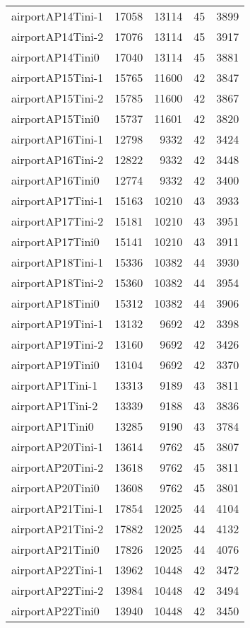 \begin{longtable}{lrrrr}
airportAP14Tini-1 & 17058 & 13114 & 45 & 3899 \\
airportAP14Tini-2 & 17076 & 13114 & 45 & 3917 \\
airportAP14Tini0 & 17040 & 13114 & 45 & 3881 \\
airportAP15Tini-1 & 15765 & 11600 & 42 & 3847 \\
airportAP15Tini-2 & 15785 & 11600 & 42 & 3867 \\
airportAP15Tini0 & 15737 & 11601 & 42 & 3820 \\
airportAP16Tini-1 & 12798 & 9332 & 42 & 3424 \\
airportAP16Tini-2 & 12822 & 9332 & 42 & 3448 \\
airportAP16Tini0 & 12774 & 9332 & 42 & 3400 \\
airportAP17Tini-1 & 15163 & 10210 & 43 & 3933 \\
airportAP17Tini-2 & 15181 & 10210 & 43 & 3951 \\
airportAP17Tini0 & 15141 & 10210 & 43 & 3911 \\
airportAP18Tini-1 & 15336 & 10382 & 44 & 3930 \\
airportAP18Tini-2 & 15360 & 10382 & 44 & 3954 \\
airportAP18Tini0 & 15312 & 10382 & 44 & 3906 \\
airportAP19Tini-1 & 13132 & 9692 & 42 & 3398 \\
airportAP19Tini-2 & 13160 & 9692 & 42 & 3426 \\
airportAP19Tini0 & 13104 & 9692 & 42 & 3370 \\
airportAP1Tini-1 & 13313 & 9189 & 43 & 3811 \\
airportAP1Tini-2 & 13339 & 9188 & 43 & 3836 \\
airportAP1Tini0 & 13285 & 9190 & 43 & 3784 \\
airportAP20Tini-1 & 13614 & 9762 & 45 & 3807 \\
airportAP20Tini-2 & 13618 & 9762 & 45 & 3811 \\
airportAP20Tini0 & 13608 & 9762 & 45 & 3801 \\
airportAP21Tini-1 & 17854 & 12025 & 44 & 4104 \\
airportAP21Tini-2 & 17882 & 12025 & 44 & 4132 \\
airportAP21Tini0 & 17826 & 12025 & 44 & 4076 \\
airportAP22Tini-1 & 13962 & 10448 & 42 & 3472 \\
airportAP22Tini-2 & 13984 & 10448 & 42 & 3494 \\
airportAP22Tini0 & 13940 & 10448 & 42 & 3450 \\

\end{longtable}
